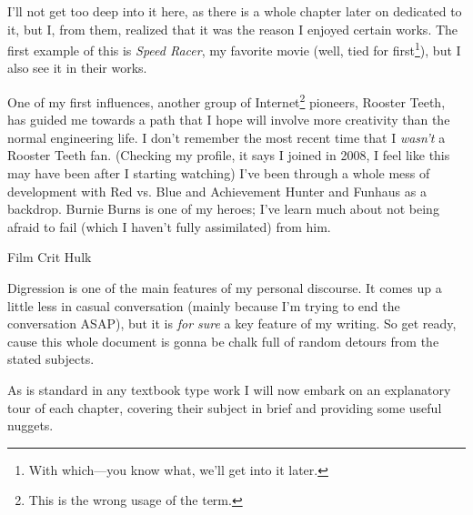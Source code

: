 \documentclass[../butidigress.tex]{subfiles}
\begin{document}
I'll not get too deep into it here, as there is a whole chapter later on dedicated to it, but I, from them, realized that it was the reason I enjoyed certain works.
The first example of this is \textit{Speed Racer}, my favorite movie (well, tied for first\footnote{With  which---you know what, we'll get into it later.}), but I also see it in their works.

One of my first influences, another group of Internet\footnote{This is the wrong usage of the term.} pioneers, Rooster Teeth, has guided me towards a path that I hope will involve more creativity than the normal engineering life.
I don't remember the most recent time that I \emph{wasn't} a Rooster Teeth fan.
(Checking my profile, it says I joined in 2008, I feel like this may have been after I starting watching)
I've been through a whole mess of development with Red vs. Blue and Achievement Hunter and Funhaus as a backdrop.
Burnie Burns is one of my heroes; I've learn much about not being afraid to fail (which I haven't fully assimilated) from him.

Film Crit Hulk

Digression is one of the main features of my personal discourse.
It comes up a little less in casual conversation (mainly because I'm trying to end the conversation ASAP), but it is \emph{for sure} a key feature of my writing.
So get ready, cause this whole document is gonna be chalk full of random detours from the stated subjects.

As is standard in any textbook type work I will now embark on an explanatory tour of each chapter, covering their subject in brief and providing some useful nuggets.
\end{document}
